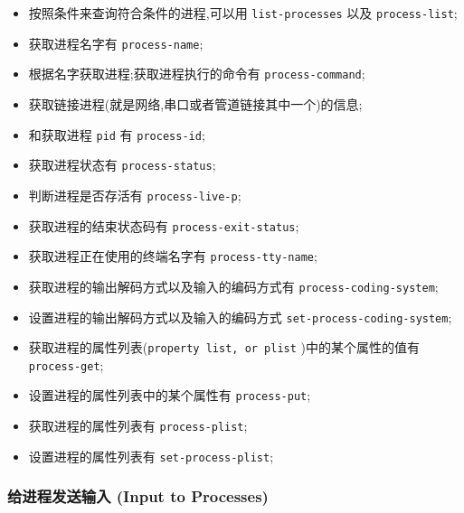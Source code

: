 \documentclass[11pt]{article}
\begin{document}
\begin{itemize}
\item 按照条件来查询符合条件的进程,可以用 \texttt{list-processes} 以及 \texttt{process-list};

\item 获取进程名字有 \texttt{process-name};

\item 根据名字获取进程;获取进程执行的命令有 \texttt{process-command};

\item 获取链接进程(就是网络,串口或者管道链接其中一个)的信息;

\item 和获取进程 \texttt{pid} 有 \texttt{process-id};

\item 获取进程状态有 \texttt{process-status};

\item 判断进程是否存活有 \texttt{process-live-p};

\item 获取进程的结束状态码有 \texttt{process-exit-status};

\item 获取进程正在使用的终端名字有 \texttt{process-tty-name};

\item 获取进程的输出解码方式以及输入的编码方式有 \texttt{process-coding-system};

\item 设置进程的输出解码方式以及输入的编码方式 \texttt{set-process-coding-system};

\item 获取进程的属性列表(\texttt{property list, or plist} )中的某个属性的值有 \texttt{process-get};

\item 设置进程的属性列表中的某个属性有 \texttt{process-put};

\item 获取进程的属性列表有 \texttt{process-plist};

\item 设置进程的属性列表有 \texttt{set-process-plist};
\end{itemize}



\subsubsection{给进程发送输入 (Input to Processes)}
\label{sec:org57d3f71}
\end{document}
